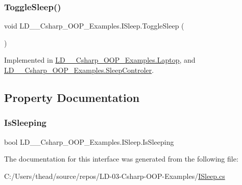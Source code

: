 \subsubsection{\texorpdfstring{Toggle\+Sleep()}{ToggleSleep()}}
{\footnotesize\ttfamily void L\+D\+\_\+\_\+\+Csharp\+\_\+\+O\+O\+P\+\_\+\+Examples.\+I\+Sleep.\+Toggle\+Sleep (\begin{DoxyParamCaption}{ }\end{DoxyParamCaption})}



Implemented in \mbox{\hyperlink{class_l_d__03___csharp___o_o_p___examples_1_1_laptop_a28f09dd23331929b11cdc77720153e21}{L\+D\+\_\+\_\+\+Csharp\+\_\+\+O\+O\+P\+\_\+\+Examples.\+Laptop}}, and \mbox{\hyperlink{class_l_d__03___csharp___o_o_p___examples_1_1_sleep_controler_ad8b90b3fa29e24828b2d739961458dba}{L\+D\+\_\+\_\+\+Csharp\+\_\+\+O\+O\+P\+\_\+\+Examples.\+Sleep\+Controler}}.



\subsection{Property Documentation}
\mbox{\label{interface_l_d__03___csharp___o_o_p___examples_1_1_i_sleep_a676dbf702e3243c35818e41970b77d90}} 
\subsubsection{\texorpdfstring{Is\+Sleeping}{IsSleeping}}
{\footnotesize\ttfamily bool L\+D\+\_\+\_\+\+Csharp\+\_\+\+O\+O\+P\+\_\+\+Examples.\+I\+Sleep.\+Is\+Sleeping\hspace{0.3cm}{\ttfamily [get]}}



The documentation for this interface was generated from the following file\+:\begin{DoxyCompactItemize}
\item 
C\+:/\+Users/thead/source/repos/\+L\+D-\/03-\/\+Csharp-\/\+O\+O\+P-\/\+Examples/\mbox{\hyperlink{_i_sleep_8cs}{I\+Sleep.\+cs}}\end{DoxyCompactItemize}
